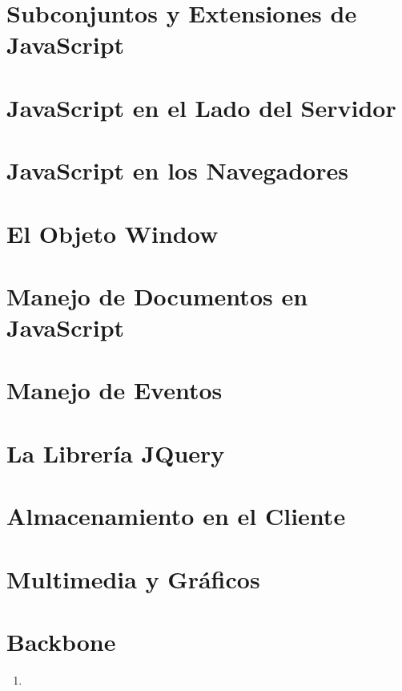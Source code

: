 \chapter{Subconjuntos y Extensiones de JavaScript}

\chapter{JavaScript en el Lado del Servidor}


\chapter{JavaScript en los Navegadores}

\chapter{El Objeto Window}

\chapter{Manejo de Documentos en JavaScript}


\chapter{Manejo de Eventos}



\chapter{La Librería JQuery}

\chapter{Almacenamiento en el Cliente}

\chapter{Multimedia y Gráficos}


\chapter{Backbone}
\begin{enumerate}
\item 
{}
\end{enumerate}

